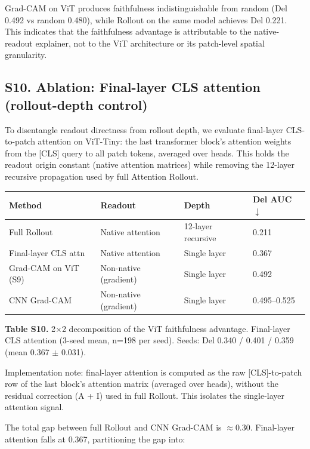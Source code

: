 \documentclass[11pt,a4paper]{article}
\begin{document}
Grad-CAM on ViT produces faithfulness indistinguishable from random (Del 0.492 vs random 0.480), while Rollout on the same model achieves Del 0.221. This indicates that the faithfulness advantage is attributable to the native-readout explainer, not to the ViT architecture or its patch-level spatial granularity.

\subsection*{S10. Ablation: Final-layer CLS attention (rollout-depth control)}

To disentangle readout directness from rollout depth, we evaluate final-layer CLS-to-patch attention on ViT-Tiny: the last transformer block's attention weights from the [CLS] query to all patch tokens, averaged over heads. This holds the readout origin constant (native attention matrices) while removing the 12-layer recursive propagation used by full Attention Rollout.

\begin{tabular}{llll}
\toprule
Method & Readout & Depth & Del AUC $\downarrow$ \\
\midrule
Full Rollout & Native attention & 12-layer recursive & 0.211 \\
Final-layer CLS attn & Native attention & Single layer & 0.367 \\
Grad-CAM on ViT (S9) & Non-native (gradient) & Single layer & 0.492 \\
CNN Grad-CAM & Non-native (gradient) & Single layer & 0.495--0.525 \\
\bottomrule
\end{tabular}


\textbf{Table S10.} 2$\times$2 decomposition of the ViT faithfulness advantage. Final-layer CLS attention (3-seed mean, n=198 per seed). Seeds: Del 0.340 / 0.401 / 0.359 (mean 0.367 $\pm$ 0.031).

Implementation note: final-layer attention is computed as the raw [CLS]-to-patch row of the last block's attention matrix (averaged over heads), without the residual correction (\textonehalf{}A + \textonehalf{}I) used in full Rollout. This isolates the single-layer attention signal.

The total gap between full Rollout and CNN Grad-CAM is $\approx$0.30. Final-layer attention falls at 0.367, partitioning the gap into:
\end{document}
